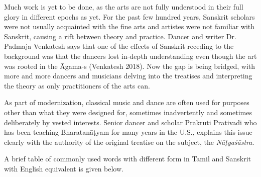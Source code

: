 Much work is yet to be done, as the arts are not fully understood in their full glory in different epochs as yet. For the past few hundred years, Sanskrit scholars were not usually acquainted with the fine arts and artistes were not familiar with Sanskrit, causing a rift between theory and practice. Dancer and writer Dr. Padmaja Venkatesh says that one of the effects of Sanskrit receding to the background was that the dancers lost in-depth understanding even though the art was rooted in the Āgama-s (Venkatesh 2018). Now the gap is being bridged, with more and more dancers and musicians delving into the treatises and interpreting the theory as only practitioners of the arts can.

As part of modernization, classical music and dance are often used for purposes other than what they were designed for, sometimes inadvertently and sometimes deliberately by vested interests. Senior dancer and scholar Prakruti Prativadi who has been teaching Bharatanāṭyam for many years in the U.S., explains this issue clearly with the authority of the original treatise on the subject, the \textit{Nāṭyaśāstra}.

A brief table of commonly used words with different form in Tamil and Sanskrit with English equivalent is given below.

